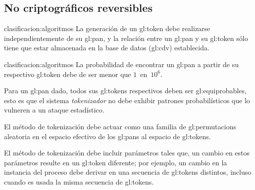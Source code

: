 %
%

\subsection{No criptográficos reversibles}

{clasificacion:algoritmos}
{
  La generación de un \gls{gl:token} debe realizarse independientemente de
  su \gls{gl:pan}, y la relación entre un \gls{gl:pan} y su \gls{gl:token}
  sólo tiene que estar almacenada en la base de datos (\gls{gl:cdv})
  establecida.
}

{clasificacion:algoritmos}
{
  La probabilidad de encontrar un \gls{gl:pan} a partir de su respectivo
  \gls{gl:token} debe de ser menor que $1$~en~$10^6$.
}

{
  Para un \gls{gl:pan} dado, todos sus \glspl{gl:token} respectivos
  deben ser \glspl{gl:equiprobable}, esto es que el sistema
  \textit{tokenizador} no debe exhibir patrones probabilísticos que
  lo vulneren a un ataque estadístico.
}

{
  El método de tokenización debe actuar como una familia de
  \glspl{gl:permutacion} aleatoria en el espacio efectivo de los
  \glspl{gl:pan} al espacio de \glspl{gl:token}.
}

{
  El método de tokenización debe incluir parámetros tales que, un
  cambio en estos parámetros resulte en un \gls{gl:token} diferente;
  por ejemplo, un cambio en la instancia del proceso debe derivar en
  una secuencia de \glspl{gl:token} distintos, incluso cuando es usada
  la misma secuencia de \glspl{gl:token}.
}


